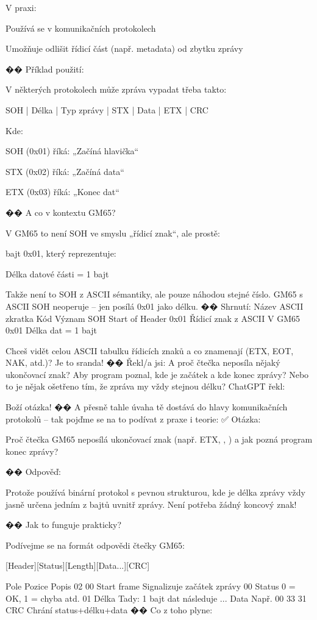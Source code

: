 V praxi:

    Používá se v komunikačních protokolech

    Umožňuje odlišit řídicí část (např. metadata) od zbytku zprávy

�� Příklad použití:

V některých protokolech může zpráva vypadat třeba takto:

SOH | Délka | Typ zprávy | STX | Data | ETX | CRC

Kde:

    SOH (0x01) říká: „Začíná hlavička“

    STX (0x02) říká: „Začíná data“

    ETX (0x03) říká: „Konec dat“

�� A co v kontextu GM65?

V GM65 to není SOH ve smyslu „řídicí znak“, ale prostě:

    bajt 0x01, který reprezentuje:

        Délka datové části = 1 bajt

Takže není to SOH z ASCII sémantiky, ale pouze náhodou stejné číslo. GM65 s ASCII SOH neoperuje – jen posílá 0x01 jako délku.
�� Shrnutí:
Název	ASCII zkratka	Kód	Význam
SOH	Start of Header	0x01	Řídicí znak z ASCII
V GM65	0x01		Délka dat = 1 bajt

Chceš vidět celou ASCII tabulku řídicích znaků a co znamenají (ETX, EOT, NAK, atd.)? Je to sranda! ��
Řekl/a jsi:
A proč čtečka neposíla nějaký ukončovací znak? Aby program poznal, kde je začátek a kde konec zprávy? Nebo to je nějak ošetřeno tím, že zpráva my vždy stejnou délku?
ChatGPT řekl:

Boží otázka! �� A přesně tahle úvaha tě dostává do hlavy komunikačních protokolů – tak pojďme se na to podívat z praxe i teorie:
✅ Otázka:

    Proč čtečka GM65 neposílá ukončovací znak (např. ETX, \n, \0) a jak pozná program konec zprávy?

�� Odpověď:

    Protože používá binární protokol s pevnou strukturou, kde je délka zprávy vždy jasně určena jedním z bajtů uvnitř zprávy.
    Není potřeba žádný koncový znak!

�� Jak to funguje prakticky?

Podívejme se na formát odpovědi čtečky GM65:

[Header][Status][Length][Data...][CRC]

Pole	Pozice	Popis
02 00	Start frame	Signalizuje začátek zprávy
00	Status	0 = OK, 1 = chyba atd.
01	Délka	Tady: 1 bajt dat následuje
...	Data	Např. 00
33 31	CRC	Chrání status+délku+data
�� Co z toho plyne:

